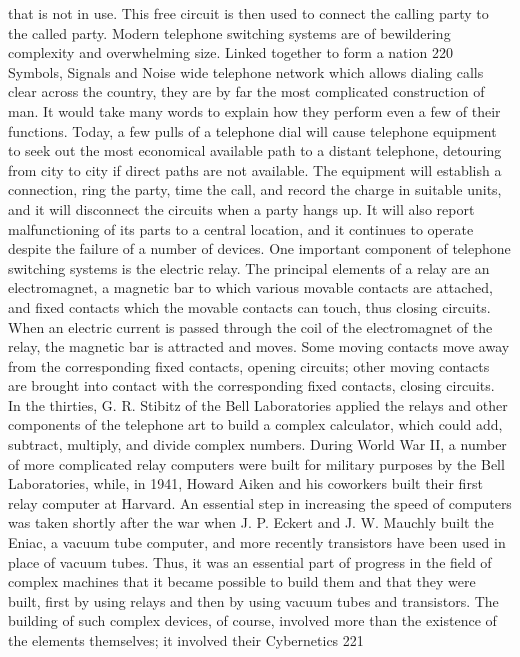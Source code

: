 {{{{{{{{{{{that is not in use. This free circuit is then used to connect the calling
party to the called party.
Modern telephone switching systems are of bewildering complexity
and overwhelming size. Linked together to form a nation
220
Symbols, Signals and Noise
wide telephone network which allows dialing calls clear across the
country, they are by far the most complicated construction of man.
It would take many words to explain how they perform even a few
of their functions. Today, a few pulls of a telephone dial will cause
telephone equipment to seek out the most economical available
path to a distant telephone, detouring from city to city if direct
paths are not available. The equipment will establish a connection,
ring the party, time the call, and record the charge in suitable units,
and it will disconnect the circuits when a party hangs up. It will
also report malfunctioning of its parts to a central location, and it
continues to operate despite the failure of a number of devices.
One important component of telephone switching systems is the
electric relay. The principal elements of a relay are an electromagnet,
a magnetic bar to which various movable contacts are
attached, and fixed contacts which the movable contacts can
touch, thus closing circuits. When an electric current is passed
through the coil of the electromagnet of the relay, the magnetic
bar is attracted and moves. Some moving contacts move away from
the corresponding fixed contacts, opening circuits; other moving
contacts are brought into contact with the corresponding fixed
contacts, closing circuits.
In the thirties, G. R. Stibitz of the Bell Laboratories applied the
relays and other components of the telephone art to build a complex
calculator, which could add, subtract, multiply, and divide
complex numbers. During World War II, a number of more complicated
relay computers were built for military purposes by the
Bell Laboratories, while, in 1941, Howard Aiken and his coworkers
built their first relay computer at Harvard.
An essential step in increasing the speed of computers was
taken shortly after the war when J. P. Eckert and J. W. Mauchly
built the Eniac, a vacuum tube computer, and more recently
transistors have been used in place of vacuum tubes.
Thus, it was an essential part of progress in the field of complex
machines that it became possible to build them and that they were
built, first by using relays and then by using vacuum tubes and
transistors.
The building of such complex devices, of course, involved more
than the existence of the elements themselves; it involved their
Cybernetics 221
}}}}}}}}}}}
